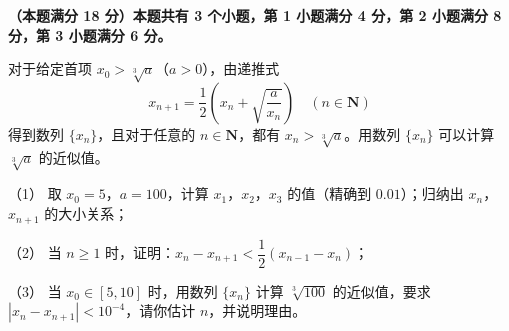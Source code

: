 \begin{question}
\textbf{（本题满分 18 分）本题共有 3 个小题，第 1 小题满分 4 分，第 2 小题满分 8 分，第 3 小题满分 6 分。} 

对于给定首项 $x_0>\sqrt[3]a$（$a>0$），由递推式
\nopagebreak[4]
\[x_{n+1}=\frac12\left(x_n+\sqrt{\frac a{x_n}}\right)\quad(n\in\mathbf N)\]
得到数列 $\{x_n\}$，且对于任意的 $n\in\mathbf N$，都有 $x_n>\sqrt[3]a$。用数列 $\{x_n\}$ 可以计算 $\sqrt[3]a$ 的近似值。

（1） 取 $x_0=5$，$a=100$，计算 $x_1$，$x_2$，$x_3$ 的值（精确到 $0.01$）；归纳出 $x_n$，$x_{n+1}$ 的大小关系；

（2） 当 $n\geqslant1$ 时，证明：$x_n-x_{n+1}<\dfrac12(x_{n-1}-x_n)$；

（3） 当 $x_0\in[5,10]$ 时，用数列 $\{x_n\}$ 计算 $\sqrt[3]{100}$ 的近似值，要求 $|x_n-x_{n+1}|<10^{-4}$，请你估计 $n$，并说明理由。

\clearpage

\end{question}